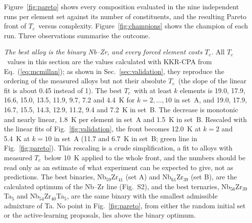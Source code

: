 \documentclass[aps,prb,reprint,superscriptaddress,twocolumn,floatfix]{revtex4-2}
\newcommand{\Tc}{$T_c$}
\begin{document}
Figure~\ref{fig:pareto} shows every composition evaluated in the nine independent runs per
element set against its number of constituents, and the resulting Pareto front of \Tc\
versus complexity. Figure~\ref{fig:champions} shows the champion of each run. Three
observations summarise the outcome.

\emph{The best alloy is the binary Nb--Zr, and every forced element costs \Tc.}
All \Tc\ values in this section are the values calculated with KKR-CPA from
Eq.~(\ref{eq:mcmillan}); as shown in Sec.~\ref{sec:validation}, they reproduce the
ordering of the measured alloys but not their absolute \Tc\ (the slope of the linear fit is
about 0.45 instead of 1).
The best \Tc\ with at least $k$ elements is 19.0, 17.9, 16.6, 15.0, 13.5, 11.9, 9.7, 7.2 and
4.4~K for $k = 2, \dots, 10$ in set~A, and 19.0, 17.9, 16.7, 15.5, 14.3, 12.9, 11.2, 9.4 and
7.2~K in set~B. The decrease is monotonic and nearly linear, 1.8~K per element in set~A and
1.5~K in set~B. Rescaled with the linear fits of Fig.~\ref{fig:validation}, the front
becomes 12.0~K at $k = 2$ and 5.4~K at $k = 10$ in set~A (11.7 and 6.7~K in set~B; green line
in Fig.~\ref{fig:pareto}). This rescaling is a crude simplification, a fit to alloys with
measured \Tc\ below 10~K applied to the whole front, and the numbers should be read only as an
estimate of what experiment can be expected to give, not as predictions. The best binaries, Nb$_{59}$Zr$_{41}$ (set A) and Nb$_{61}$Zr$_{39}$ (set B),
are the calculated optimum of the Nb--Zr line (Fig.~S2), and the best
ternaries, Nb$_{56}$Zr$_{39}$Ta$_5$ and Nb$_{54}$Zr$_{40}$Ta$_5$, are the same binary with the
smallest admissible admixture of Ta. No point in Fig.~\ref{fig:pareto}, from either the
random initial set or the active-learning proposals, lies above the binary optimum.
\end{document}
